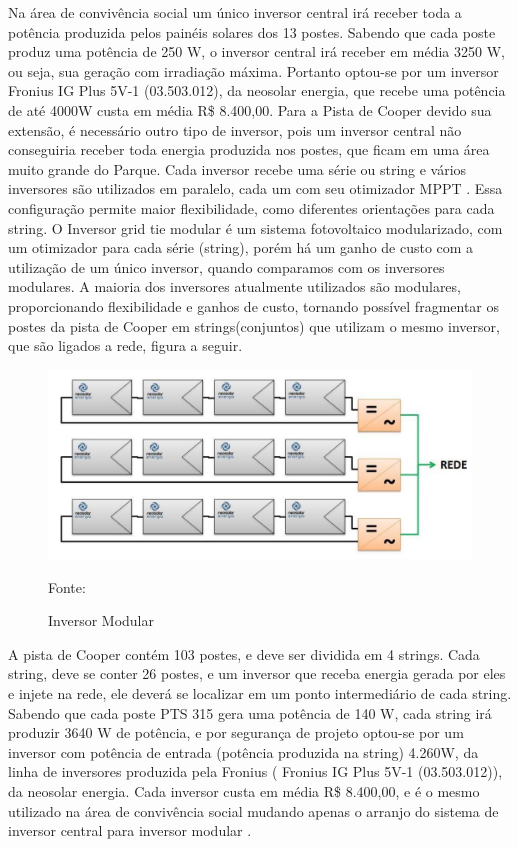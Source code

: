 	Na \'area de conviv\^encia social um \'unico inversor central ir\'a receber toda a pot\^encia produzida pelos pain\'eis solares dos  13 postes. Sabendo que cada poste produz uma pot\^encia de 250 W, o inversor central ir\'a receber em m\'edia 3250 W, ou seja, sua gera\c{c}\~ao com irradia\c{c}\~ao m\'axima. Portanto optou-se por um inversor Fronius IG Plus 5V-1 (03.503.012), da neosolar energia, que recebe uma pot\^encia de at\'e 4000W custa em m\'edia R\$ 8.400,00.
	Para a Pista de Cooper devido sua extens\~ao, \'e necess\'ario outro tipo de inversor, pois um inversor central n\~ao conseguiria receber toda energia produzida nos postes, que ficam em uma \'area muito grande do Parque. Cada inversor recebe uma s\'erie ou string e v\'arios inversores s\~ao utilizados em paralelo, cada um com seu otimizador MPPT \cite{SUNLABPTS}. Essa configura\c{c}\~ao permite maior flexibilidade, como diferentes orienta\c{c}\~oes para cada string.  O Inversor grid tie modular \'e um sistema fotovoltaico modularizado, com um otimizador para cada s\'erie (string), por\'em h\'a um ganho de custo com a utiliza\c{c}\~ao de um \'unico inversor, quando comparamos com os inversores modulares. A maioria dos inversores atualmente utilizados s\~ao modulares,  proporcionando flexibilidade e ganhos de custo, tornando poss\'ivel fragmentar os postes da pista de Cooper em strings(conjuntos) que utilizam o mesmo inversor, que s\~ao ligados a rede, figura a seguir.
	
\begin{figure}[H]
	\centering
	\label{InversorModular}
		\includegraphics[keepaspectratio=true,scale=0.9]{figuras/InversorModular.png}
	\caption{Inversor Modular}
	\small{Fonte: \cite{NEOSOLAR} }
\end{figure}
	
	A pista de Cooper cont\'em 103 postes, e deve ser dividida em 4 strings. Cada string, deve se conter 26 postes, e um inversor que receba energia gerada por eles e injete na rede, ele dever\'a se localizar em um ponto intermedi\'ario de cada string. Sabendo que cada poste PTS 315 gera uma pot\^encia de 140 W, cada string ir\'a produzir 3640 W de pot\^encia, e por seguran\c{c}a de projeto optou-se por um inversor com pot\^encia de entrada (pot\^encia produzida na string) 4.260W, da linha de inversores produzida pela  Fronius ( Fronius IG Plus 5V-1 (03.503.012)), da neosolar energia. Cada inversor custa em m\'edia R\$ 8.400,00, e \'e o mesmo utilizado na \'area de conviv\^encia social mudando apenas o arranjo do sistema de inversor central para inversor modular \cite{SUNLABPTS}. 
	
